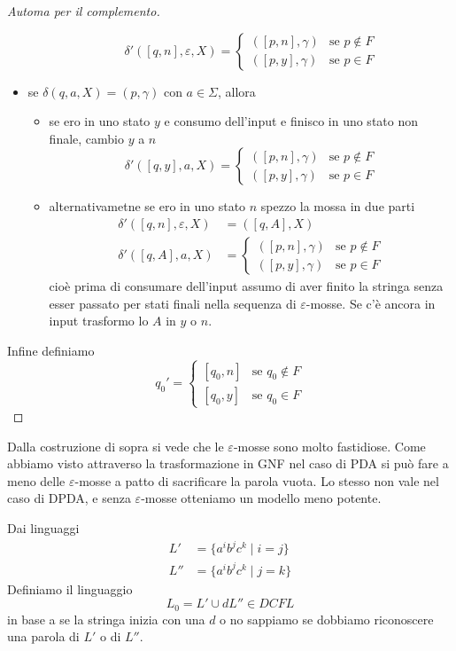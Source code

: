 \documentclass[12pt]{report}
\theoremstyle{definition}
\begin{document}
\begin{proof}[Automa per il complemento]
\begin{itemize}
\begin{itemize}
				$$\delta'([q, n], \varepsilon, X) = \begin{cases} ([p, n], \gamma) & \text{se } p \not \in F \\ ([p, y], \gamma) & \text{se } p \in F \end{cases}$$
		\end{itemize}
	\item se $\delta(q, a, X) = (p, \gamma)$ con $a \in \Sigma$, allora
		\begin{itemize}
			\item se ero in uno stato $y$ e consumo dell'input e finisco in uno stato non finale, cambio $y$ a $n$
				$$\delta'([q, y], a, X) = \begin{cases} ([p, n], \gamma) & \text{se } p \not \in F \\ ([p, y], \gamma) & \text{se } p \in F \end{cases}$$
			\item alternativametne se ero in uno stato $n$ spezzo la mossa in due parti
				\begin{align*}
					\delta'([q, n], \varepsilon, X) &= ([q, A], X) \\
					\delta'([q, A], a, X) &= \begin{cases} ([p, n], \gamma) & \text{se } p \not \in F \\ ([p, y], \gamma) & \text{se } p \in F \end{cases}
				\end{align*}
				cioè prima di consumare dell'input assumo di aver finito la stringa senza esser passato per stati finali nella sequenza di $\varepsilon$-mosse.
				Se c'è ancora in input trasformo lo $A$ in $y$ o $n$.
		\end{itemize}
\end{itemize}
Infine definiamo
$$ q_0' = \begin{cases} [q_0, n] & \text{se } q_0 \not \in F \\ [q_0, y] & \text{se } q_0 \in F \end{cases} $$
\end{proof}

Dalla costruzione di sopra si vede che le $\varepsilon$-mosse sono molto fastidiose.
Come abbiamo visto attraverso la trasformazione in GNF nel caso di PDA si può fare a meno delle $\varepsilon$-mosse a patto di sacrificare la parola vuota.
Lo stesso non vale nel caso di DPDA, e senza $\varepsilon$-mosse otteniamo un modello meno potente.

Dai linguaggi 
\begin{align*}
	L' &= \{ a^i b^j c^k \mid i = j \} \\
	L'' &= \{ a^i b^j c^k \mid j = k \}
\end{align*}
Definiamo il linguaggio 
$$ L_0 = L' \cup dL'' \in DCFL $$
in base a se la stringa inizia con una $d$ o no sappiamo se dobbiamo riconoscere una parola di $L'$ o di $L''$.
\end{document}
